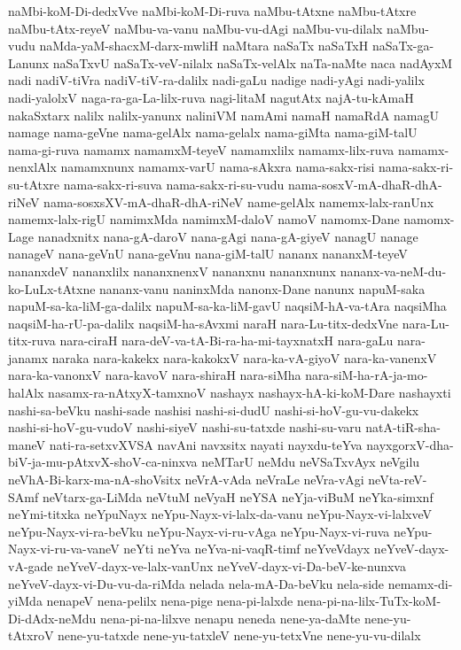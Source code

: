 {naMbi-koM-Di-dedxVve
naMbi-koM-Di-ruva
naMbu-tAtxne
naMbu-tAtxre
naMbu-tAtx-reyeV
naMbu-va-vanu
naMbu-vu-dAgi
naMbu-vu-dilalx
naMbu-vudu
naMda-yaM-shacxM-darx-mwliH
naMtara
naSaTx
naSaTxH
naSaTx-ga-Lanunx
naSaTxvU
naSaTx-veV-nilalx
naSaTx-velAlx
naTa-naMte
naca
nadAyxM
nadi
nadiV-tiVra
nadiV-tiV-ra-dalilx
nadi-gaLu
nadige
nadi-yAgi
nadi-yalilx
nadi-yalolxV
naga-ra-ga-La-lilx-ruva
nagi-litaM
nagutAtx
najA-tu-kAmaH
nakaSxtarx
nalilx
nalilx-yanunx
naliniVM
namAmi
namaH
namaRdA
namagU
namage
nama-geVne
nama-gelAlx
nama-gelalx
nama-giMta
nama-giM-talU
nama-gi-ruva
namamx
namamxM-teyeV
namamxlilx
namamx-lilx-ruva
namamx-nenxlAlx
namamxnunx
namamx-varU
nama-sAkxra
nama-sakx-risi
nama-sakx-ri-su-tAtxre
nama-sakx-ri-suva
nama-sakx-ri-su-vudu
nama-sosxV-mA-dhaR-dhA-riNeV
nama-sosxsXV-mA-dhaR-dhA-riNeV
name-gelAlx
namemx-lalx-ranUnx
namemx-lalx-rigU
namimxMda
namimxM-daloV
namoV
namomx-Dane
namomx-Lage
nanadxnitx
nana-gA-daroV
nana-gAgi
nana-gA-giyeV
nanagU
nanage
nanageV
nana-geVnU
nana-geVnu
nana-giM-talU
nananx
nananxM-teyeV
nananxdeV
nananxlilx
nananxnenxV
nananxnu
nananxnunx
nananx-va-neM-du-ko-LuLx-tAtxne
nananx-vanu
naninxMda
nanonx-Dane
nanunx
napuM-saka
napuM-sa-ka-liM-ga-dalilx
napuM-sa-ka-liM-gavU
naqsiM-hA-va-tAra
naqsiMha
naqsiM-ha-rU-pa-dalilx
naqsiM-ha-sAvxmi
naraH
nara-Lu-titx-dedxVne
nara-Lu-titx-ruva
nara-ciraH
nara-deV-va-tA-Bi-ra-ha-mi-tayxnatxH
nara-gaLu
nara-janamx
naraka
nara-kakekx
nara-kakokxV
nara-ka-vA-giyoV
nara-ka-vanenxV
nara-ka-vanonxV
nara-kavoV
nara-shiraH
nara-siMha
nara-siM-ha-rA-ja-mo-halAlx
nasamx-ra-nAtxyX-tamxnoV
nashayx
nashayx-hA-ki-koM-Dare
nashayxti
nashi-sa-beVku
nashi-sade
nashisi
nashi-si-dudU
nashi-si-hoV-gu-vu-dakekx
nashi-si-hoV-gu-vudoV
nashi-siyeV
nashi-su-tatxde
nashi-su-varu
natA-tiR-sha-maneV
nati-ra-setxvXVSA
navAni
navxsitx
nayati
nayxdu-teYva
nayxgorxV-dha-biV-ja-mu-pAtxvX-shoV-ca-ninxva
neMTarU
neMdu
neVSaTxvAyx
neVgilu
neVhA-Bi-karx-ma-nA-shoVsitx
neVrA-vAda
neVraLe
neVra-vAgi
neVta-reV-SAmf
neVtarx-ga-LiMda
neVtuM
neVyaH
neYSA
neYja-viBuM
neYka-simxnf
neYmi-titxka
neYpuNayx
neYpu-Nayx-vi-lalx-da-vanu
neYpu-Nayx-vi-lalxveV
neYpu-Nayx-vi-ra-beVku
neYpu-Nayx-vi-ru-vAga
neYpu-Nayx-vi-ruva
neYpu-Nayx-vi-ru-va-vaneV
neYti
neYva
neYva-ni-vaqR-timf
neYveVdayx
neYveV-dayx-vA-gade
neYveV-dayx-ve-lalx-vanUnx
neYveV-dayx-vi-Da-beV-ke-nunxva
neYveV-dayx-vi-Du-vu-da-riMda
nelada
nela-mA-Da-beVku
nela-side
nemamx-di-yiMda
nenapeV
nena-pelilx
nena-pige
nena-pi-lalxde
nena-pi-na-lilx-TuTx-koM-Di-dAdx-neMdu
nena-pi-na-lilxve
nenapu
neneda
nene-ya-daMte
nene-yu-tAtxroV
nene-yu-tatxde
nene-yu-tatxleV
nene-yu-tetxVne
nene-yu-vu-dilalx
}

